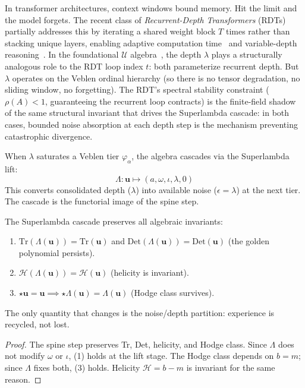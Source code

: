 In transformer architectures, context windows bound memory. Hit the limit and the model forgets. The recent class of \emph{Recurrent-Depth Transformers} (RDTs) partially addresses this by iterating a shared weight block $T$ times rather than stacking unique layers, enabling adaptive computation time~\cite{Graves2016ACT} and variable-depth reasoning~\cite{Dehghani2019UT,Bae2024RRT}. In the foundational $\mathcal{U}$ algebra~\cite{larue_lc}, the depth $\lambda$ plays a structurally analogous role to the RDT loop index $t$: both parameterize recurrent depth. But $\lambda$ operates on the Veblen ordinal hierarchy (so there is no tensor degradation, no sliding window, no forgetting). The RDT's spectral stability constraint ($\rho(A) < 1$, guaranteeing the recurrent loop contracts) is the finite-field shadow of the same structural invariant that drives the Superlambda cascade: in both cases, bounded noise absorption at each depth step is the mechanism preventing catastrophic divergence.

\begin{definition}
When $\lambda$ saturates a Veblen tier $\varphi_\alpha$, the algebra cascades via the Superlambda lift:
$$\Lambda : \mathbf{u} \mapsto (a, \omega, \iota, \lambda, 0)$$
This converts consolidated depth ($\lambda$) into available noise ($\epsilon = \lambda$) at the next tier. The cascade is the functorial image of the spine step.
\end{definition}

\begin{theorem}
The Superlambda cascade preserves all algebraic invariants:
\begin{enumerate}
\item $\mathrm{Tr}(\Lambda(\mathbf{u})) = \mathrm{Tr}(\mathbf{u})$ and $\mathrm{Det}(\Lambda(\mathbf{u})) = \mathrm{Det}(\mathbf{u})$ (the golden polynomial persists).
\item $\mathcal{H}(\Lambda(\mathbf{u})) = \mathcal{H}(\mathbf{u})$ (helicity is invariant).
\item $\star \mathbf{u} = \mathbf{u} \implies \star \Lambda(\mathbf{u}) = \Lambda(\mathbf{u})$ (Hodge class survives).
\end{enumerate}
The only quantity that changes is the noise/depth partition: experience is recycled, not lost.
\end{theorem}

\begin{proof}
The spine step preserves Tr, Det, helicity, and Hodge class. Since $\Lambda$ does not modify $\omega$ or $\iota$, (1) holds at the lift stage. The Hodge class depends on $b = m$; since $\Lambda$ fixes both, (3) holds. Helicity $\mathcal{H} = b - m$ is invariant for the same reason. \qedhere
\end{proof}

